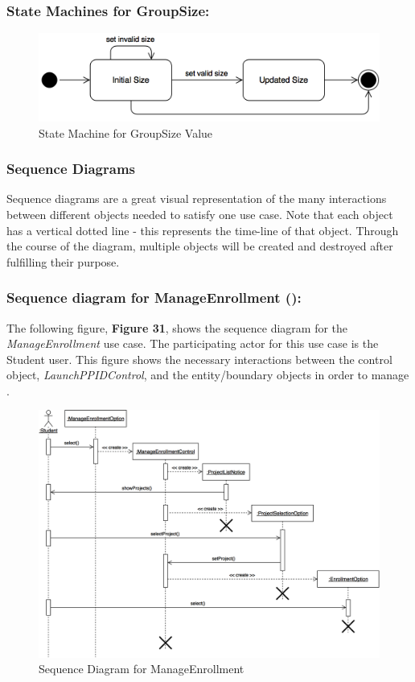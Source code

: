 \documentclass[12pt,letterpaper]{article}
\begin{document}
\subsubsection*{State Machines for GroupSize:}

\begin{figure}[H]
	\centering{}
	\includegraphics[scale=0.3]{imgs/state/group-size-value.png}
	\caption{State Machine for GroupSize Value}
\end{figure}

\subsubsection*{Sequence Diagrams}

Sequence diagrams are a great visual representation of the many interactions between different objects needed to satisfy one use case. Note that
each object has a vertical dotted line - this represents the time-line of that object. Through the course of the diagram, multiple objects will be created
and destroyed after fulfilling their purpose.

\subsubsection*{Sequence diagram for ManageEnrollment (\manageenrollment{}):}

The following figure, {\bf Figure 31}, shows the sequence diagram for the {\it ManageEnrollment} use case. The participating actor for this use case
is the Student user. This figure shows the necessary interactions between the control object, {\it LaunchPPIDControl}, and the entity/boundary objects
in order to manage \manageenrollment{}.

\begin{figure}[H]
	\centering{}
	\includegraphics[scale=0.3]{imgs/seq/manage-enrollment.png}
	\caption{Sequence Diagram for ManageEnrollment}
\end{figure}
\end{document}

